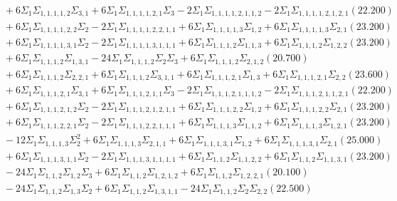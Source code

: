 \documentclass[12pt]{article}
\begin{document}
\begin{landscape}
\begin{align*}
		&\quad\quad +6\Sigma_{1}\Sigma_{1,1,1,1,2}\Sigma_{3,1}+6\Sigma_{1}\Sigma_{1,1,1,1,2,1}\Sigma_{3}-2\Sigma_{1}\Sigma_{1,1,1,1,2,1,1,2}-2\Sigma_{1}\Sigma_{1,1,1,1,2,1,2,1}(22.200) \\ 
		&\quad\quad +6\Sigma_{1}\Sigma_{1,1,1,1,2,2}\Sigma_{2}-2\Sigma_{1}\Sigma_{1,1,1,1,2,2,1,1}+6\Sigma_{1}\Sigma_{1,1,1,1,3}\Sigma_{1,2}+6\Sigma_{1}\Sigma_{1,1,1,1,3}\Sigma_{2,1}(23.200) \\ 
		&\quad\quad +6\Sigma_{1}\Sigma_{1,1,1,1,3,1}\Sigma_{2}-2\Sigma_{1}\Sigma_{1,1,1,1,3,1,1,1}+6\Sigma_{1}\Sigma_{1,1,1,2}\Sigma_{1,1,3}+6\Sigma_{1}\Sigma_{1,1,1,2}\Sigma_{1,2,2}(23.200) \\ 
		&\quad\quad +6\Sigma_{1}\Sigma_{1,1,1,2}\Sigma_{1,3,1}-24\Sigma_{1}\Sigma_{1,1,1,2}\Sigma_{2}\Sigma_{3}+6\Sigma_{1}\Sigma_{1,1,1,2}\Sigma_{2,1,2}(20.700) \\ 
		&\quad\quad +6\Sigma_{1}\Sigma_{1,1,1,2}\Sigma_{2,2,1}+6\Sigma_{1}\Sigma_{1,1,1,2}\Sigma_{3,1,1}+6\Sigma_{1}\Sigma_{1,1,1,2,1}\Sigma_{1,3}+6\Sigma_{1}\Sigma_{1,1,1,2,1}\Sigma_{2,2}(23.600) \\ 
		&\quad\quad +6\Sigma_{1}\Sigma_{1,1,1,2,1}\Sigma_{3,1}+6\Sigma_{1}\Sigma_{1,1,1,2,1,1}\Sigma_{3}-2\Sigma_{1}\Sigma_{1,1,1,2,1,1,1,2}-2\Sigma_{1}\Sigma_{1,1,1,2,1,1,2,1}(22.200) \\ 
		&\quad\quad +6\Sigma_{1}\Sigma_{1,1,1,2,1,2}\Sigma_{2}-2\Sigma_{1}\Sigma_{1,1,1,2,1,2,1,1}+6\Sigma_{1}\Sigma_{1,1,1,2,2}\Sigma_{1,2}+6\Sigma_{1}\Sigma_{1,1,1,2,2}\Sigma_{2,1}(23.200) \\ 
		&\quad\quad +6\Sigma_{1}\Sigma_{1,1,1,2,2,1}\Sigma_{2}-2\Sigma_{1}\Sigma_{1,1,1,2,2,1,1,1}+6\Sigma_{1}\Sigma_{1,1,1,3}\Sigma_{1,1,2}+6\Sigma_{1}\Sigma_{1,1,1,3}\Sigma_{1,2,1}(23.200) \\ 
		&\quad\quad -12\Sigma_{1}\Sigma_{1,1,1,3}\Sigma_{2}^{2}+6\Sigma_{1}\Sigma_{1,1,1,3}\Sigma_{2,1,1}+6\Sigma_{1}\Sigma_{1,1,1,3,1}\Sigma_{1,2}+6\Sigma_{1}\Sigma_{1,1,1,3,1}\Sigma_{2,1}(25.000) \\ 
		&\quad\quad +6\Sigma_{1}\Sigma_{1,1,1,3,1,1}\Sigma_{2}-2\Sigma_{1}\Sigma_{1,1,1,3,1,1,1,1}+6\Sigma_{1}\Sigma_{1,1,2}\Sigma_{1,1,2,2}+6\Sigma_{1}\Sigma_{1,1,2}\Sigma_{1,1,3,1}(23.200) \\ 
		&\quad\quad -24\Sigma_{1}\Sigma_{1,1,2}\Sigma_{1,2}\Sigma_{3}+6\Sigma_{1}\Sigma_{1,1,2}\Sigma_{1,2,1,2}+6\Sigma_{1}\Sigma_{1,1,2}\Sigma_{1,2,2,1}(20.100) \\ 
		&\quad\quad -24\Sigma_{1}\Sigma_{1,1,2}\Sigma_{1,3}\Sigma_{2}+6\Sigma_{1}\Sigma_{1,1,2}\Sigma_{1,3,1,1}-24\Sigma_{1}\Sigma_{1,1,2}\Sigma_{2}\Sigma_{2,2}(22.500) \\ 

\end{align*}
\end{landscape}
\end{document}
